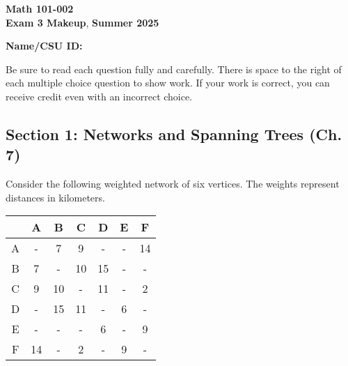 \documentclass[12pt]{exam}
\newcommand{\class}{Math 101-002}
\newcommand{\examnum}{Exam 3 Makeup}
\newcommand{\examdate}{Summer 2025}
\begin{document}
\pagestyle{plain}
\thispagestyle{empty}

\noindent
\textbf{\class}\\
\textbf{\examnum}, \textbf{\examdate} \\

\vspace{10pt}

\textbf{Name/CSU ID:}

\vspace{10pt}

Be sure to read each question fully and carefully. There is space to the right of each multiple choice question to show work. If your work is correct, you can receive credit even with an incorrect choice.

\begin{questions}

\section*{Section 1: Networks and Spanning Trees (Ch. 7)}

\question[12] Consider the following weighted network of six vertices. The weights represent distances in kilometers.

\begin{center}
\begin{tabular}{c|cccccc}
 & A & B & C & D & E & F \\
\hline
A & - & 7 & 9 & - & - & 14 \\
B & 7 & - & 10 & 15 & - & - \\
C & 9 & 10 & - & 11 & - & 2 \\
D & - & 15 & 11 & - & 6 & - \\
E & - & - & - & 6 & - & 9 \\
F & 14 & - & 2 & - & 9 & - \\
\end{tabular}
\end{center}

\end{questions}
\end{document}
